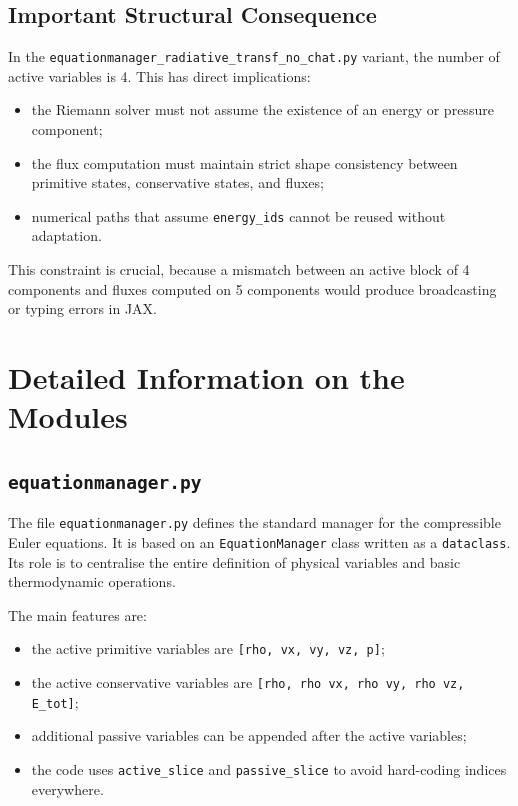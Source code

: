 \documentclass[a4paper, 11pt]{article}
\begin{document}
\subsection{Important Structural Consequence}
In the \texttt{equationmanager\_radiative\_transf\_no\_chat.py} variant, the number of active variables is 4. This has direct implications:
\begin{itemize}
    \item the Riemann solver must not assume the existence of an energy or pressure component;
    \item the flux computation must maintain strict shape consistency between primitive states, conservative states, and fluxes;
    \item numerical paths that assume \texttt{energy\_ids} cannot be reused without adaptation.
\end{itemize}

This constraint is crucial, because a mismatch between an active block of 4 components and fluxes computed on 5 components would produce broadcasting or typing errors in JAX.

\section{Detailed Information on the Modules}

\subsection{\texttt{equationmanager.py}}
The file \texttt{equationmanager.py} defines the standard manager for the compressible Euler equations. It is based on an \texttt{EquationManager} class written as a \texttt{dataclass}. Its role is to centralise the entire definition of physical variables and basic thermodynamic operations.

The main features are:
\begin{itemize}
    \item the active primitive variables are \texttt{[rho, vx, vy, vz, p]};
    \item the active conservative variables are \texttt{[rho, rho\,vx, rho\,vy, rho\,vz, E\_tot]};
    \item additional passive variables can be appended after the active variables;
    \item the code uses \texttt{active\_slice} and \texttt{passive\_slice} to avoid hard-coding indices everywhere.
\end{itemize}
\end{document}

